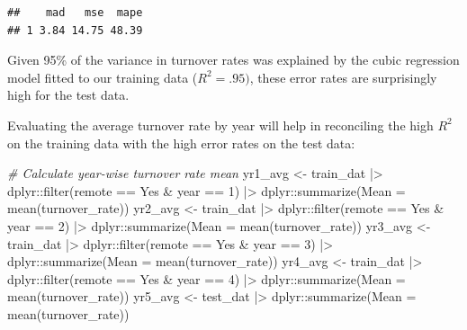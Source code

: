 \documentclass[
]{book}
\newenvironment{Shaded}{\begin{snugshade}}{\end{snugshade}}
\newcommand{\AttributeTok}[1]{\textcolor[rgb]{0.77,0.63,0.00}{#1}}
\newcommand{\CommentTok}[1]{\textcolor[rgb]{0.56,0.35,0.01}{\textit{#1}}}
\newcommand{\DecValTok}[1]{\textcolor[rgb]{0.00,0.00,0.81}{#1}}
\newcommand{\FunctionTok}[1]{\textcolor[rgb]{0.00,0.00,0.00}{#1}}
\newcommand{\NormalTok}[1]{#1}
\newcommand{\OtherTok}[1]{\textcolor[rgb]{0.56,0.35,0.01}{#1}}
\newcommand{\SpecialCharTok}[1]{\textcolor[rgb]{0.00,0.00,0.00}{#1}}
\newcommand{\StringTok}[1]{\textcolor[rgb]{0.31,0.60,0.02}{#1}}
\begin{document}
\begin{verbatim}
##    mad   mse  mape
## 1 3.84 14.75 48.39
\end{verbatim}

Given 95\% of the variance in turnover rates was explained by the cubic regression model fitted to our training data (\(R^2 = .95)\), these error rates are surprisingly high for the test data.

Evaluating the average turnover rate by year will help in reconciling the high \(R^2\) on the training data with the high error rates on the test data:

\begin{Shaded}
\begin{Highlighting}[]
\CommentTok{\# Calculate year{-}wise turnover rate mean}
\NormalTok{yr1\_avg }\OtherTok{\textless{}{-}}\NormalTok{ train\_dat }\SpecialCharTok{|\textgreater{}}\NormalTok{ dplyr}\SpecialCharTok{::}\FunctionTok{filter}\NormalTok{(remote }\SpecialCharTok{==} \StringTok{\textquotesingle{}Yes\textquotesingle{}} \SpecialCharTok{\&}\NormalTok{ year }\SpecialCharTok{==} \DecValTok{1}\NormalTok{) }\SpecialCharTok{|\textgreater{}}\NormalTok{ dplyr}\SpecialCharTok{::}\FunctionTok{summarize}\NormalTok{(}\AttributeTok{Mean =} \FunctionTok{mean}\NormalTok{(turnover\_rate))}
\NormalTok{yr2\_avg }\OtherTok{\textless{}{-}}\NormalTok{ train\_dat }\SpecialCharTok{|\textgreater{}}\NormalTok{ dplyr}\SpecialCharTok{::}\FunctionTok{filter}\NormalTok{(remote }\SpecialCharTok{==} \StringTok{\textquotesingle{}Yes\textquotesingle{}} \SpecialCharTok{\&}\NormalTok{ year }\SpecialCharTok{==} \DecValTok{2}\NormalTok{) }\SpecialCharTok{|\textgreater{}}\NormalTok{ dplyr}\SpecialCharTok{::}\FunctionTok{summarize}\NormalTok{(}\AttributeTok{Mean =} \FunctionTok{mean}\NormalTok{(turnover\_rate))}
\NormalTok{yr3\_avg }\OtherTok{\textless{}{-}}\NormalTok{ train\_dat }\SpecialCharTok{|\textgreater{}}\NormalTok{ dplyr}\SpecialCharTok{::}\FunctionTok{filter}\NormalTok{(remote }\SpecialCharTok{==} \StringTok{\textquotesingle{}Yes\textquotesingle{}} \SpecialCharTok{\&}\NormalTok{ year }\SpecialCharTok{==} \DecValTok{3}\NormalTok{) }\SpecialCharTok{|\textgreater{}}\NormalTok{ dplyr}\SpecialCharTok{::}\FunctionTok{summarize}\NormalTok{(}\AttributeTok{Mean =} \FunctionTok{mean}\NormalTok{(turnover\_rate))}
\NormalTok{yr4\_avg }\OtherTok{\textless{}{-}}\NormalTok{ train\_dat }\SpecialCharTok{|\textgreater{}}\NormalTok{ dplyr}\SpecialCharTok{::}\FunctionTok{filter}\NormalTok{(remote }\SpecialCharTok{==} \StringTok{\textquotesingle{}Yes\textquotesingle{}} \SpecialCharTok{\&}\NormalTok{ year }\SpecialCharTok{==} \DecValTok{4}\NormalTok{) }\SpecialCharTok{|\textgreater{}}\NormalTok{ dplyr}\SpecialCharTok{::}\FunctionTok{summarize}\NormalTok{(}\AttributeTok{Mean =} \FunctionTok{mean}\NormalTok{(turnover\_rate))}
\NormalTok{yr5\_avg }\OtherTok{\textless{}{-}}\NormalTok{ test\_dat }\SpecialCharTok{|\textgreater{}}\NormalTok{ dplyr}\SpecialCharTok{::}\FunctionTok{summarize}\NormalTok{(}\AttributeTok{Mean =} \FunctionTok{mean}\NormalTok{(turnover\_rate))}


\end{Highlighting}
\end{Shaded}
\end{document}
